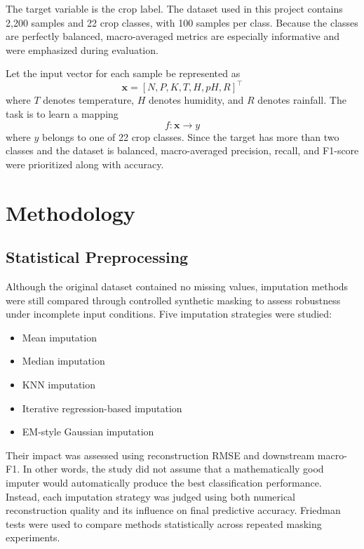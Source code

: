 \documentclass[conference]{IEEEtran}
\begin{document}
The target variable is the crop label. The dataset used in this project contains 2,200 samples and 22 crop classes, with 100 samples per class. Because the classes are perfectly balanced, macro-averaged metrics are especially informative and were emphasized during evaluation.

Let the input vector for each sample be represented as
\begin{equation}
\mathbf{x} = [N, P, K, T, H, pH, R]^\top
\end{equation}
where $T$ denotes temperature, $H$ denotes humidity, and $R$ denotes rainfall. The task is to learn a mapping
\begin{equation}
f : \mathbf{x} \rightarrow y
\end{equation}
where $y$ belongs to one of 22 crop classes. Since the target has more than two classes and the dataset is balanced, macro-averaged precision, recall, and F1-score were prioritized along with accuracy.

\section{Methodology}
\subsection{Statistical Preprocessing}
Although the original dataset contained no missing values, imputation methods were still compared through controlled synthetic masking to assess robustness under incomplete input conditions. Five imputation strategies were studied:
\begin{itemize}
    \item Mean imputation
    \item Median imputation
    \item KNN imputation
    \item Iterative regression-based imputation
    \item EM-style Gaussian imputation
\end{itemize}

Their impact was assessed using reconstruction RMSE and downstream macro-F1. In other words, the study did not assume that a mathematically good imputer would automatically produce the best classification performance. Instead, each imputation strategy was judged using both numerical reconstruction quality and its influence on final predictive accuracy. Friedman tests were used to compare methods statistically across repeated masking experiments.
\end{document}

